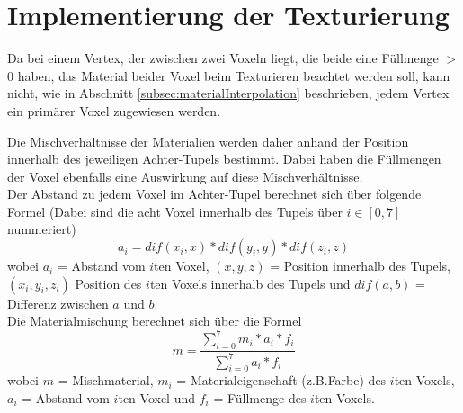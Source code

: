 
\section{Implementierung der  Texturierung}
\label{sec:implementierungTexturierung}
Da bei einem Vertex, der zwischen zwei Voxeln liegt, die beide eine Füllmenge $>$ 0 haben, das Material beider Voxel beim Texturieren beachtet werden soll, kann nicht, wie in Abschnitt \ref{subsec:materialInterpolation} beschrieben, jedem Vertex ein primärer Voxel zugewiesen werden.

Die Mischverhältnisse der Materialien werden daher anhand der Position innerhalb des jeweiligen Achter-Tupels bestimmt. Dabei haben die Füllmengen der Voxel ebenfalls eine Auswirkung auf diese Mischverhältnisse.
\\

Der Abstand zu jedem Voxel im Achter-Tupel berechnet sich über folgende Formel (Dabei sind die acht Voxel innerhalb des Tupels über $i \in [0,7]$ nummeriert)
\[a_i= dif(x_i,x)*dif(y_i,y)*dif(z_i,z)\]
wobei $a_i$ = Abstand vom $i$ten Voxel, $(x,y,z)$ = Position innerhalb des Tupels, $(x_i,y_i,z_i)$ Position des $i$ten Voxels innerhalb des Tupels und $dif(a,b)$ = Differenz zwischen $a$ und $b$.
\\

Die Materialmischung berechnet sich über die Formel
\[m = \frac{\sum\limits_{i=0}^{7}m_i*a_i*f_i}{\sum\limits_{i=0}^{7}a_i*f_i}\]
wobei $m$ = Mischmaterial, $m_i$ = Materialeigenschaft (z.B.Farbe)  des $i$ten Voxels, $a_i$ = Abstand vom $i$ten Voxel und $f_i$ = Füllmenge des $i$ten Voxels.